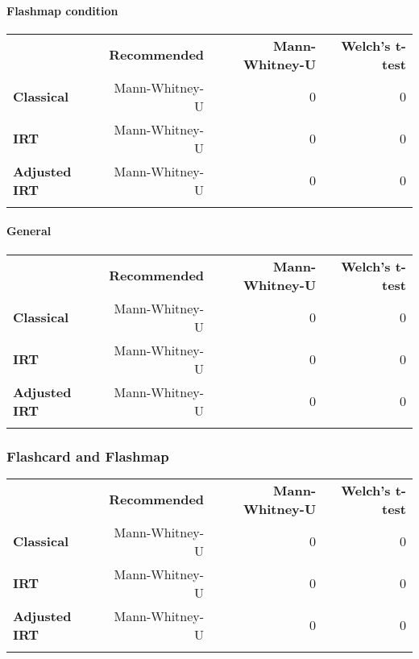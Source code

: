\paragraph{Flashmap condition}\label{flashmap-condition-3}

\begin{longtable}[c]{@{}lrrr@{}}
\toprule\addlinespace
& \textbf{Recommended} & \textbf{Mann-Whitney-U} & \textbf{Welch's
t-test}
\\\addlinespace
\midrule\endhead
\textbf{Classical} & Mann-Whitney-U & 0 & 0
\\\addlinespace
\textbf{IRT} & Mann-Whitney-U & 0 & 0
\\\addlinespace
\textbf{Adjusted IRT} & Mann-Whitney-U & 0 & 0
\\\addlinespace
\bottomrule
\end{longtable}

\paragraph{General}\label{general}

\begin{longtable}[c]{@{}lrrr@{}}
\toprule\addlinespace
& \textbf{Recommended} & \textbf{Mann-Whitney-U} & \textbf{Welch's
t-test}
\\\addlinespace
\midrule\endhead
\textbf{Classical} & Mann-Whitney-U & 0 & 0
\\\addlinespace
\textbf{IRT} & Mann-Whitney-U & 0 & 0
\\\addlinespace
\textbf{Adjusted IRT} & Mann-Whitney-U & 0 & 0
\\\addlinespace
\bottomrule
\end{longtable}

\subsubsection{Flashcard and Flashmap}\label{flashcard-and-flashmap}

\begin{longtable}[c]{@{}lrrr@{}}
\toprule\addlinespace
& \textbf{Recommended} & \textbf{Mann-Whitney-U} & \textbf{Welch's
t-test}
\\\addlinespace
\midrule\endhead
\textbf{Classical} & Mann-Whitney-U & 0 & 0
\\\addlinespace
\textbf{IRT} & Mann-Whitney-U & 0 & 0
\\\addlinespace
\textbf{Adjusted IRT} & Mann-Whitney-U & 0 & 0
\\\addlinespace
\bottomrule
\end{longtable}

